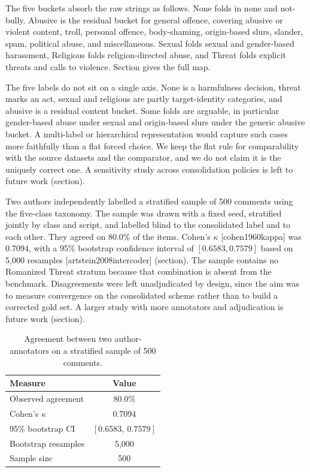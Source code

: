 \documentclass[11pt,a4paper]{article}
\def\citep#1{[#1]}%
\def\Cref#1{Section}%
\def\cref#1{section}%
\def\texttt#1{#1}%
\def\emph#1{#1}%
\begin{document}
The five buckets absorb the raw strings as follows. \emph{None} folds in \texttt{none} and \texttt{not-bully}. \emph{Abusive} is the residual bucket for general offence, covering abusive or violent content, troll, personal offence, body-shaming, origin-based slurs, slander, spam, political abuse, and miscellaneous. \emph{Sexual} folds sexual and gender-based harassment, \emph{Religious} folds religion-directed abuse, and \emph{Threat} folds explicit threats and calls to violence. \Cref{tab:consolidation} gives the full map.

The five labels do not sit on a single axis. \emph{None} is a harmfulness decision, \emph{threat} marks an act, \emph{sexual} and \emph{religious} are partly target-identity categories, and \emph{abusive} is a residual content bucket. Some folds are arguable, in particular gender-based abuse under \emph{sexual} and origin-based slurs under the generic \emph{abusive} bucket. A multi-label or hierarchical representation would capture such cases more faithfully than a flat forced choice. We keep the flat rule for comparability with the source datasets and the comparator, and we do not claim it is the uniquely correct one. A sensitivity study across consolidation policies is left to future work (\cref{sec:limitations}).

Two authors independently labelled a stratified sample of 500 comments using the five-class taxonomy. The sample was drawn with a fixed seed, stratified jointly by class and script, and labelled blind to the consolidated label and to each other. They agreed on 80.0\% of the items. Cohen's $\kappa$ \citep{cohen1960kappa} was 0.7094, with a 95\% bootstrap confidence interval of $[0.6583, 0.7579]$ based on 5{,}000 resamples \citep{artstein2008intercoder} (\cref{tab:iaa}). The sample contains no Romanized Threat stratum because that combination is absent from the benchmark. Disagreements were left unadjudicated by design, since the aim was to measure convergence on the consolidated scheme rather than to build a corrected gold set. A larger study with more annotators and adjudication is future work (\cref{sec:limitations}).

\begin{table}[!htbp]
\centering
\caption{Agreement between two author-annotators on a stratified sample of 500 comments.}
\label{tab:iaa}
\small
\begin{tabular}{@{}lc@{}}
\toprule
\textbf{Measure} & \textbf{Value} \\
\midrule
Observed agreement & 80.0\% \\
Cohen's $\kappa$ & 0.7094 \\
95\% bootstrap CI & $[0.6583,\ 0.7579]$ \\
Bootstrap resamples & 5{,}000 \\
Sample size & 500 \\
\bottomrule
\end{tabular}
\end{table}
\end{document}
